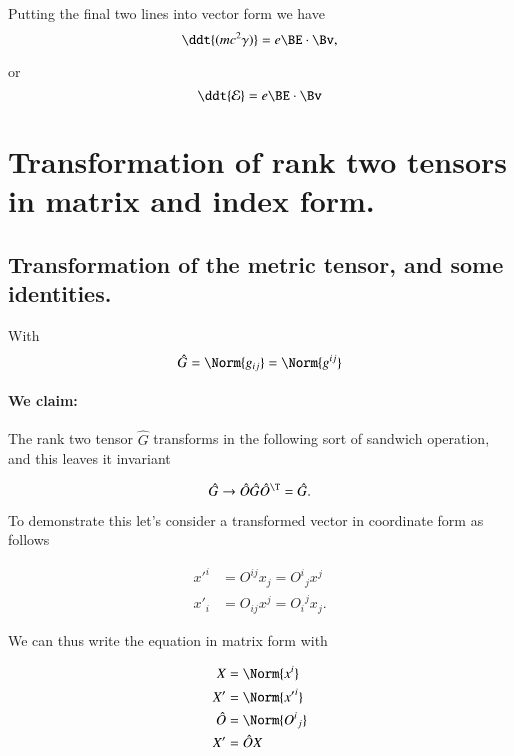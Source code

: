 Putting the final two lines into vector form we have
\begin{equation}\label{eqn:relativisticElectrodynamicsL11:330}
\ddt{ (m c^2 \gamma)} = e \BE \cdot \Bv,
\end{equation}

or
\begin{equation}\label{eqn:relativisticElectrodynamicsL11:350}
\ddt{ \mathcal{E} } = e \BE \cdot \Bv
\end{equation}

\section{Transformation of rank two tensors in matrix and index form.}

\subsection{Transformation of the metric tensor, and some identities.}

With
\begin{equation}\label{eqn:relativisticElectrodynamicsL11:410}
\hat{G} = \Norm{ g_{i j} } = \Norm{ g^{i j} }
\end{equation}

\paragraph{We claim:}
The rank two tensor $\hat{G}$ transforms in the following sort of sandwich operation, and this leaves it invariant

\begin{equation}\label{eqn:relativisticElectrodynamicsL11:430}
\hat{G} \rightarrow \hat{O} \hat{G} \hat{O}^\T = \hat{G}.
\end{equation}

To demonstrate this let's consider a transformed vector in coordinate form as follows

\begin{align}\label{eqn:relativisticElectrodynamicsL11:450}
{x'}^i &= O^{i j} x_j = {O^i}_j x^j \\
{x'}_i &= O_{i j} x^j = {O_i}^j x_j.
\end{align}

We can thus write the equation in matrix form with

\begin{align}\label{eqn:relativisticElectrodynamicsL11:940}
X &= \Norm{x^i} \\
X' &= \Norm{{x'}^i} \\
\hat{O} &= \Norm{{O^i}_j} \\
X' &= \hat{O} X
\end{align}

